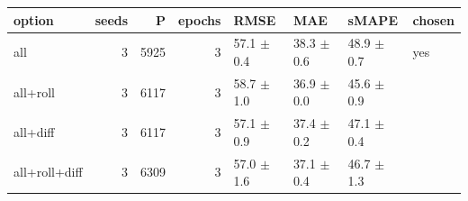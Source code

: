 \begin{tabular}{lrrrllll}
\toprule
option & seeds & P & epochs & RMSE & MAE & sMAPE & chosen \\
\midrule
all & 3 & 5925 & 3 & 57.1 $\pm$ 0.4 & 38.3 $\pm$ 0.6 & 48.9 $\pm$ 0.7 & yes \\
all+roll & 3 & 6117 & 3 & 58.7 $\pm$ 1.0 & 36.9 $\pm$ 0.0 & 45.6 $\pm$ 0.9 &  \\
all+diff & 3 & 6117 & 3 & 57.1 $\pm$ 0.9 & 37.4 $\pm$ 0.2 & 47.1 $\pm$ 0.4 &  \\
all+roll+diff & 3 & 6309 & 3 & 57.0 $\pm$ 1.6 & 37.1 $\pm$ 0.4 & 46.7 $\pm$ 1.3 &  \\
\bottomrule
\end{tabular}
